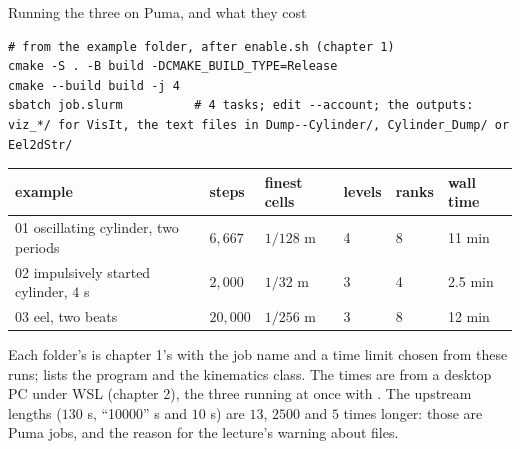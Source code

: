 \documentclass[aspectratio=169,11pt]{beamer}
\begin{document}
\begin{frame}[fragile]{Running the three on Puma, and what they cost}
\label{fr:puma}
\begin{lstlisting}[style=shell]
# from the example folder, after enable.sh (chapter 1)
cmake -S . -B build -DCMAKE_BUILD_TYPE=Release
cmake --build build -j 4
sbatch job.slurm          # 4 tasks; edit --account; the outputs: viz_*/ for VisIt, the text files in Dump--Cylinder/, Cylinder_Dump/ or Eel2dStr/
\end{lstlisting}
\begin{center}
\scriptsize
\begin{tabular}{@{}llllll@{}}
\toprule
example & steps & finest cells & levels & ranks & wall time\\
\midrule
01 oscillating cylinder, two periods & $6{,}667$ & $1/128$ m & 4 & 8 & 11 min\\
02 impulsively started cylinder, $4$ s & $2{,}000$ & $1/32$ m & 3 & 4 & 2.5 min\\
03 eel, two beats & $20{,}000$ & $1/256$ m & 3 & 8 & 12 min\\
\bottomrule
\end{tabular}
\end{center}
\footnotesize Each folder's  is chapter 1's with the job name and a time limit chosen from these runs;  lists the program and the kinematics class. The times are from a desktop PC under WSL (chapter 2), the three running at once with . The upstream lengths ($130$ s, ``10000'' s and $10$ s) are $13$, $2500$ and $5$ times longer: those are Puma jobs, and the reason for the lecture's warning about files.
\end{frame}
\end{document}
